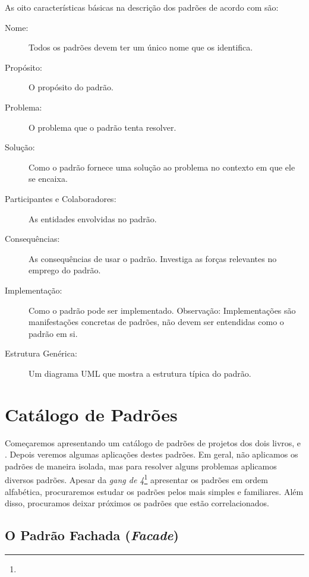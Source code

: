 \documentclass[
	11pt,				%
	openright,
	twoside,			%
	a4paper,			%
	english,			%
	french,
	brazil,				%
	sumario=tradicional
	]{abntex2}
\begin{document}
As oito características básicas na descrição dos padrões de acordo com  são:
\begin{description}
\item[Nome:] Todos os padrões devem ter um único nome que os identifica.

\item[Propósito:] O propósito do padrão.

\item[Problema:] O problema que o padrão tenta resolver.

\item[Solução:] Como o padrão fornece uma solução ao problema no contexto em que ele se encaixa.

\item[Participantes e Colaboradores:] As entidades envolvidas no padrão.

\item[Consequências:] As consequências de usar o padrão. Investiga as forças relevantes no emprego do padrão.

\item[Implementação:] Como o padrão pode ser implementado. Observação: Implementações são manifestações concretas de padrões, não devem ser entendidas como o padrão em si.

\item[Estrutura Genérica:] Um diagrama UML que mostra a estrutura típica do padrão.

\end{description}

\section{Catálogo de Padrões}

Começaremos apresentando um catálogo de padrões de projetos dos dois livros,  e . Depois veremos algumas aplicações destes padrões. Em geral, não aplicamos os padrões de maneira isolada, mas para resolver alguns problemas aplicamos diversos padrões. Apesar da \textit{gang de 4}\footnote{} apresentar os padrões em ordem alfabética, procuraremos estudar os padrões pelos mais simples e familiares. Além disso, procuramos deixar próximos os padrões que estão correlacionados.

\subsection{O Padrão Fachada (\textit{Facade})}
\end{document}
